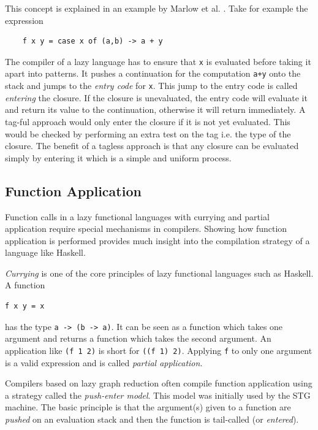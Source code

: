 \documentclass[runningheads]{llncs}
\begin{document}
This concept is explained in an example by Marlow et al. \cite{marlow2007faster}. Take for example the expression

\begin{center}
	\begin{BVerbatim}
	f x y = case x of (a,b) -> a + y
	\end{BVerbatim}
\end{center}

The compiler of a lazy language has to ensure that \texttt{x} is evaluated before taking it apart into patterns. It pushes a continuation for the computation \texttt{a+y} onto the stack and jumps to the \textit{entry code} for \texttt{x}. This jump to the entry code is called \textit{entering} the closure. If the closure is unevaluated, the entry code will evaluate it and return its value to the continuation, otherwise it will return immediately.
A tag-ful approach would only enter the closure if it is not yet evaluated. This would be checked by performing an extra test on the tag i.e. the type of the closure. The benefit of a tagless approach is that any closure can be evaluated simply by entering it which is a simple and uniform process. \cite{marlow2007faster}



\subsection{Function Application}
Function calls in a lazy functional languages with currying and partial application require special mechanisms in compilers. Showing how function application is performed provides much insight into the compilation strategy of a language like Haskell.

\textit{Currying} is one of the core principles of lazy functional languages such as Haskell. A function
\begin{verbatim}
f x y = x
\end{verbatim}
has the type \texttt{a -> (b -> a)}. It can be seen as a function which takes one argument and returns a function which takes the second argument. An application like \texttt{(f 1 2)} is short for \texttt{((f 1) 2)}. Applying \texttt{f} to only one argument is a valid expression and is called \textit{partial application}.

Compilers based on lazy graph reduction often compile function application using a strategy called the \textit{push-enter model}. This model was initially used by the STG machine. The basic principle is that the argument(s) given to a function are \textit{pushed} on an evaluation stack and then the function is tail-called (or \textit{entered})\cite{jones1992implementing}.
\end{document}
